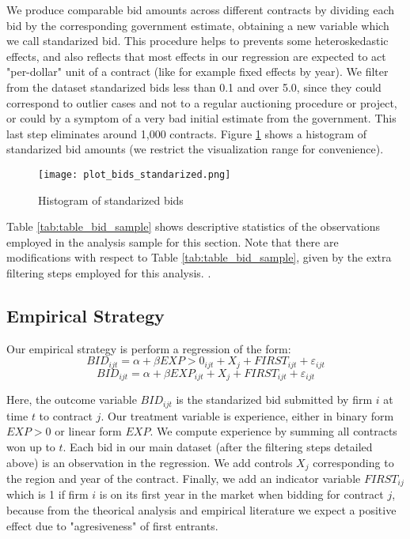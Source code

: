 We produce comparable bid amounts across different contracts by dividing each bid by the corresponding government estimate, obtaining a new variable which we call standarized bid. This procedure helps to prevents some heteroskedastic effects, and also reflects that most effects in our regression are expected to act "per-dollar" unit of a contract (like for example fixed effects by year). We filter from the dataset standarized bids less than 0.1 and over 5.0, since they could correspond to outlier cases and not to a regular auctioning procedure or project, or could by a symptom of a very bad initial estimate from the government. This last step eliminates around 1,000 contracts. Figure \ref{fig:plot_bids_standarized} shows a histogram of standarized bid amounts (we restrict the visualization range for convenience).

\begin{figure}
  \centering
  \texttt{[image: plot\_bids\_standarized.png]}
  \caption{Histogram of standarized bids}
  \label{fig:plot_bids_standarized}
\end{figure}

Table \ref{tab:table_bid_sample} shows descriptive statistics of the observations employed in the analysis sample for this section. Note that there are modifications with respect to Table \ref{tab:table_bid_sample}, given by the extra filtering steps employed for this analysis. .

\subsection{Empirical Strategy}

Our empirical strategy is perform a regression of the form:
\begin{equation}
\label{eqn:olsbids}
BID_{ijt}=\alpha+ \beta EXP>0_{ijt}+X_j+FIRST_{ijt}+\varepsilon_{ijt}
\end{equation}
\begin{equation}
\label{eqn:olsbids2}
BID_{ijt}=\alpha+ \beta EXP_{ijt}+X_j+FIRST_{ijt}+\varepsilon_{ijt}
\end{equation}

 Here, the outcome variable $BID_{ijt}$ is the standarized bid submitted by firm  $i$ at time $t$  to contract $j$. Our treatment variable is experience, either in binary form $EXP>0$ or linear form $EXP$. We compute experience by summing all contracts won up to $t$. Each bid in our main dataset (after the filtering steps detailed above) is an observation in the regression. We add controls $X_j$ corresponding to the region and year of the contract. Finally, we add an indicator variable $FIRST_{ij}$ which is 1 if firm $i$ is on its first year in the market when bidding for contract $j$, because from the theorical analysis and empirical literature we expect a positive effect due to "agresiveness" of first entrants.

